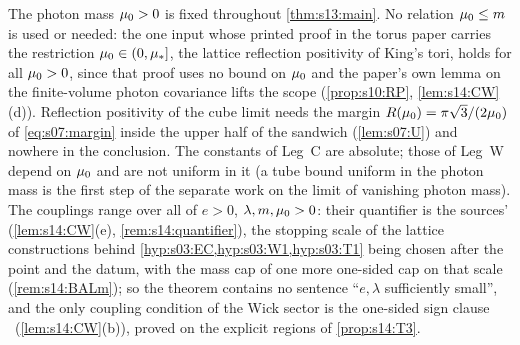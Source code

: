 \begin{remark}\label{rem:s13:mu0}
The photon mass $\mu_0>0$ is fixed throughout \cref{thm:s13:main}. No relation $\mu_0\le m$ is used or needed: the one input whose printed proof in the torus paper \cite{SymPhase} carries the restriction $\mu_0\in(0,\mu_*]$, the lattice reflection positivity of King's tori, holds for all $\mu_0>0$, since that proof uses no bound on $\mu_0$ and the paper's own lemma on the finite-volume photon covariance lifts the scope (\cref{prop:s10:RP}, \cref{lem:s14:CW}(d)). Reflection positivity of the cube limit needs the margin $R(\mu_0)=\pi\sqrt3/(2\mu_0)$ of \eqref{eq:s07:margin} inside the upper half of the sandwich (\cref{lem:s07:U}) and nowhere in the conclusion. The constants of Leg~C are absolute; those of Leg~W depend on $\mu_0$ and are not uniform in it (a tube bound uniform in the photon mass is the first step of the separate work on the limit of vanishing photon mass). The couplings range over all of $e>0$, $\lambda,m,\mu_0>0$: their quantifier is the sources' (\cref{lem:s14:CW}(e), \cref{rem:s14:quantifier}), the stopping scale of the lattice constructions behind \cref{hyp:s03:EC,hyp:s03:W1,hyp:s03:T1} being chosen after the point and the datum, with the mass cap of \cite[Prop.~3.1]{Ba2} one more one-sided cap on that scale (\cref{rem:s14:BALm}); so the theorem contains no sentence ``$e,\lambda$ sufficiently small'', and the only coupling condition of the Wick sector is the one-sided sign clause \Tthree\ (\cref{lem:s14:CW}(b)), proved on the explicit regions of \cref{prop:s14:T3}.
\end{remark}
